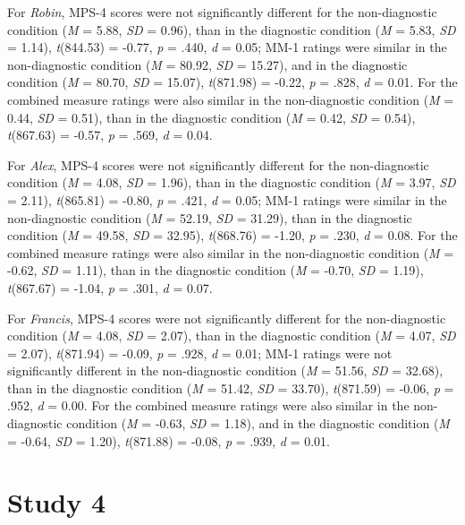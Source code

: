 \documentclass[
  american,
  man,mask,floatsintext]{apa6}
\begin{document}
For \emph{Robin}, MPS-4 scores were not significantly different for the non-diagnostic condition (\emph{M} = 5.88, \emph{SD} = 0.96), than in the diagnostic condition (\emph{M} = 5.83, \emph{SD} = 1.14), \emph{t}(844.53) = -0.77, \emph{p} = .440, \emph{d} = 0.05; MM-1 ratings were similar in the non-diagnostic condition (\emph{M} = 80.92, \emph{SD} = 15.27), and in the diagnostic condition (\emph{M} = 80.70, \emph{SD} = 15.07), \emph{t}(871.98) = -0.22, \emph{p} = .828, \emph{d} = 0.01. For the combined measure ratings were also similar in the non-diagnostic condition (\emph{M} = 0.44, \emph{SD} = 0.51), than in the diagnostic condition (\emph{M} = 0.42, \emph{SD} = 0.54), \emph{t}(867.63) = -0.57, \emph{p} = .569, \emph{d} = 0.04.

For \emph{Alex}, MPS-4 scores were not significantly different for the non-diagnostic condition (\emph{M} = 4.08, \emph{SD} = 1.96), than in the diagnostic condition (\emph{M} = 3.97, \emph{SD} = 2.11), \emph{t}(865.81) = -0.80, \emph{p} = .421, \emph{d} = 0.05; MM-1 ratings were similar in the non-diagnostic condition (\emph{M} = 52.19, \emph{SD} = 31.29), than in the diagnostic condition (\emph{M} = 49.58, \emph{SD} = 32.95), \emph{t}(868.76) = -1.20, \emph{p} = .230, \emph{d} = 0.08. For the combined measure ratings were also similar in the non-diagnostic condition (\emph{M} = -0.62, \emph{SD} = 1.11), than in the diagnostic condition (\emph{M} = -0.70, \emph{SD} = 1.19), \emph{t}(867.67) = -1.04, \emph{p} = .301, \emph{d} = 0.07.

For \emph{Francis}, MPS-4 scores were not significantly different for the non-diagnostic condition (\emph{M} = 4.08, \emph{SD} = 2.07), than in the diagnostic condition (\emph{M} = 4.07, \emph{SD} = 2.07), \emph{t}(871.94) = -0.09, \emph{p} = .928, \emph{d} = 0.01; MM-1 ratings were not significantly different in the non-diagnostic condition (\emph{M} = 51.56, \emph{SD} = 32.68), than in the diagnostic condition (\emph{M} = 51.42, \emph{SD} = 33.70), \emph{t}(871.59) = -0.06, \emph{p} = .952, \emph{d} = 0.00. For the combined measure ratings were also similar in the non-diagnostic condition (\emph{M} = -0.63, \emph{SD} = 1.18), and in the diagnostic condition (\emph{M} = -0.64, \emph{SD} = 1.20), \emph{t}(871.88) = -0.08, \emph{p} = .939, \emph{d} = 0.01.

\newpage

\hypertarget{study-4}{%
\section{Study 4}\label{study-4}}
\end{document}
